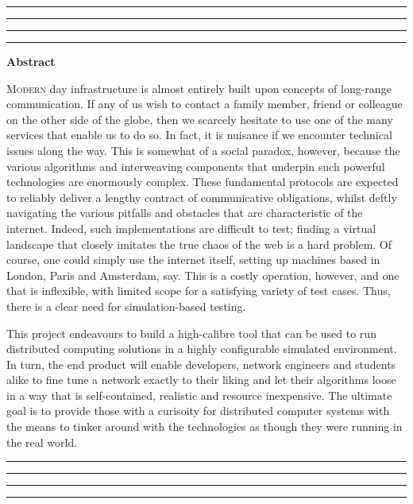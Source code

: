 \thispagestyle{empty}
\hrule\hrule\hrule\hrule %
\begin{center}
    \textbf{\large Abstract}
    \\
\end{center}

\noindent
\lettrine{M}{odern} day infrastructure is almost entirely built upon concepts of long-range communication. If any of
us wish to contact a family member, friend or colleague on the other side of the globe, then we scarcely hesitate to
use one of the many services that enable us to do so. In fact, it is nuisance if we encounter technical issues along
the way. This is somewhat of a social paradox, however, because the various algorithms and interweaving components
that underpin such powerful technologies are enormously complex. These fundamental protocols are expected to reliably
deliver a lengthy contract of communicative obligations, whilst deftly navigating the various pitfalls and obstacles
that are characteristic of the internet. Indeed, such implementations are difficult to test; finding a virtual
landscape that closely imitates the true chaos of the web is a hard problem. Of course, one could simply use the
internet itself, setting up machines based in London, Paris and Amsterdam, say. This is a costly operation, however,
and one that is inflexible, with limited scope for a satisfying variety of test cases. Thus, there is a clear need for
simulation-based testing.

This project endeavours to build a high-calibre tool that can be used to run distributed computing solutions in a
highly configurable simulated environment. In turn, the end product will enable developers, network engineers and
students alike to fine tune a network exactly to their liking and let their algorithms loose in a way that is
self-contained, realistic and resource inexpensive. The ultimate goal is to provide those with a curisoity for
distributed computer systems with the means to tinker around with the technologies as though they were running in the
real world.


\vfill
\hrule\hrule\hrule\hrule
\clearpage
